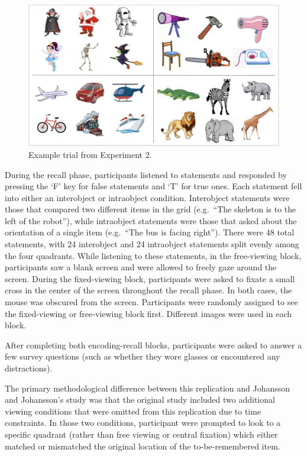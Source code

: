 \documentclass[
  man,floatsintext]{apa6}
\begin{document}
\begin{figure}
\includegraphics[width=5.47in]{group-b/E2-example-figure} \caption{Example trial from Experiment 2.}\label{fig:E2-example-trial}
\end{figure}

During the recall phase, participants listened to statements and
responded by pressing the `F' key for false statements and `T' for true
ones. Each statement fell into either an interobject or intraobject
condition. Interobject statements were those that compared two different
items in the grid (e.g.~``The skeleton is to the left of the robot''),
while intraobject statements were those that asked about the orientation
of a single item (e.g.~``The bus is facing right''). There were 48 total
statements, with 24 interobject and 24 intraobject statements split
evenly among the four quadrants. While listening to these statements, in
the free-viewing block, participants saw a blank screen and were allowed
to freely gaze around the screen. During the fixed-viewing block,
participants were asked to fixate a small cross in the center of the
screen throughout the recall phase. In both cases, the mouse was
obscured from the screen. Participants were randomly assigned to see the
fixed-viewing or free-viewing block first. Different images were used in each block.

After completing both encoding-recall blocks, participants were asked to
answer a few survey questions (such as whether they wore glasses or
encountered any distractions).

The primary methodological difference between this replication and
Johansson and Johansson's study was that the original study included two
additional viewing conditions that were omitted from this replication
due to time constraints. In those two conditions, participant were
prompted to look to a specific quadrant (rather than free viewing or
central fixation) which either matched or mismatched the original
location of the to-be-remembered item.
\end{document}
